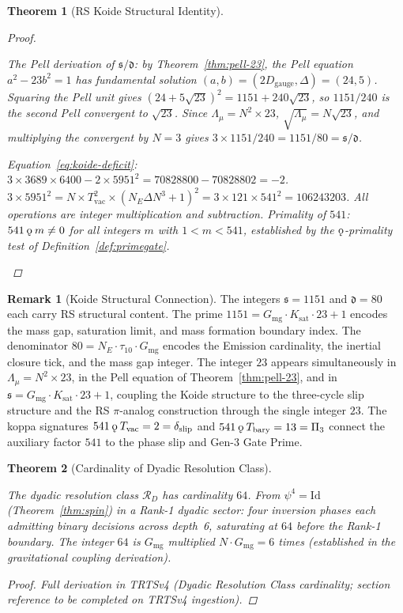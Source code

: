 \documentclass[11pt, letterpaper]{article}
\newcommand{\koppa}{\mathbin{\text{\rm\k{o}}}}
\newcommand{\Tbary}{T_{\mathrm{bary}}}
\newcommand{\Dg}{D_{\mathrm{gauge}}}
\newcommand{\Gmg}{G_{\mathrm{mg}}}
\newcommand{\Ksat}{K_{\mathrm{sat}}}
\newcommand{\dslip}{\delta_{\mathrm{slip}}}
\newcommand{\Tvac}{T_{\mathrm{vac}}}
\newcommand{\Pithree}{\Pi_3}
\theoremstyle{definition}
\newtheorem{remark}{Remark}[section]
\theoremstyle{plain}
\newtheorem{theorem}{Theorem}[section]
\begin{document}
\begin{theorem}[RS Koide Structural Identity]
\begin{proof}
\begin{rsbox}
The Pell derivation of $\mathfrak{s}/\mathfrak{d}$: by
Theorem~\ref{thm:pell-23}, the Pell equation $a^2-23b^2=1$ has
fundamental solution $(a,b)=(2\Dg,\Delta)=(24,5)$.  Squaring the
Pell unit gives $(24+5\sqrt{23})^2=1151+240\sqrt{23}$, so $1151/240$
is the second Pell convergent to $\sqrt{23}$.  Since $\Lambda_\mu=
N^2\times23$, $\sqrt{\Lambda_\mu}=N\sqrt{23}$, and multiplying the
convergent by $N=3$ gives $3\times1151/240=1151/80=
\mathfrak{s}/\mathfrak{d}$.

Equation~\eqref{eq:koide-deficit}:
$3\times3689\times6400-2\times5951^2=70828800-70828802=-2$.
$3\times5951^2=N\times\Tvac^2\times(N_E\Delta N^3+1)^2
=3\times121\times541^2=106243203$.
All operations are integer multiplication and subtraction.
Primality of $541$: $541\koppa m\neq0$ for all integers $m$ with
$1<m<541$, established by the $\koppa$-primality test of
Definition~\ref{def:primegate}.
\end{rsbox}
\end{proof}
\end{theorem}

\begin{remark}[Koide Structural Connection]
\label{rem:koide-connection}
The integers $\mathfrak{s}=1151$ and $\mathfrak{d}=80$ each carry
RS structural content.  The prime $1151=\Gmg\cdot\Ksat\cdot23+1$
encodes the mass gap, saturation limit, and mass formation boundary
index.  The denominator $80=N_E\cdot\tau_{10}\cdot\Gmg$ encodes the
Emission cardinality, the inertial closure tick, and the mass gap
integer.  The integer $23$ appears simultaneously in
$\Lambda_\mu=N^2\times23$, in the Pell equation of
Theorem~\ref{thm:pell-23}, and in $\mathfrak{s}=\Gmg\cdot\Ksat\cdot23+1$,
coupling the Koide structure to the three-cycle slip structure and the
RS $\pi$-analog construction through the single integer $23$.  The
koppa signatures $541\koppa\Tvac=2=\dslip$ and
$541\koppa\Tbary=13=\Pithree$ connect the auxiliary factor $541$ to
the phase slip and Gen-3 Gate Prime.
\end{remark}

\begin{theorem}[Cardinality of Dyadic Resolution Class]\label{thm:card-RD}
\begin{rsbox}
The dyadic resolution class $\mathcal{R}_D$ has cardinality $64$.
From $\psi^4=\mathrm{Id}$
(Theorem~\ref{thm:spin}) in a Rank-1 dyadic sector: four inversion phases
each admitting binary decisions across depth~6, saturating at $64$ before
the Rank-1 boundary.  The integer $64$ is $G_{\mathrm{mg}}$ multiplied
$N \cdot G_{\mathrm{mg}} = 6$ times (established in the gravitational
coupling derivation).
\end{rsbox}
\begin{proof}
Full derivation in TRTSv4 (Dyadic Resolution Class cardinality; section
reference to be completed on TRTSv4 ingestion).
\end{proof}
\end{theorem}
\end{document}

